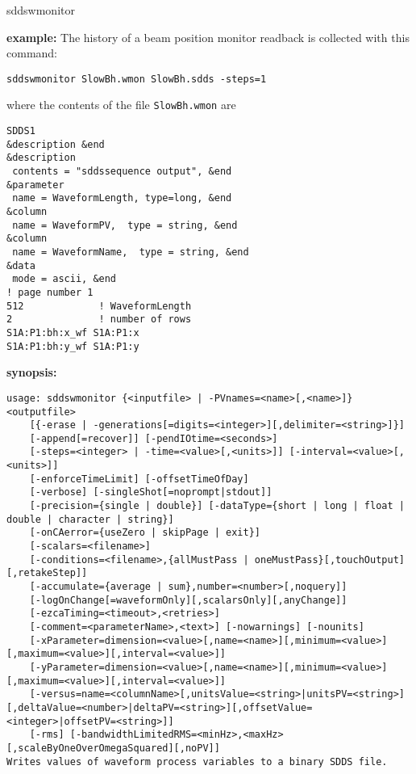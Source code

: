 \begin{sddsprog}{sddswmonitor}
\item {\bf example:} 
%
% 
%
The history of a beam position monitor readback is collected with this command:
\begin{verbatim}
sddswmonitor SlowBh.wmon SlowBh.sdds -steps=1
\end{verbatim}
where the contents of the file \verb+SlowBh.wmon+ are
\begin{verbatim}
SDDS1
&description &end
&description
 contents = "sddssequence output", &end
&parameter
 name = WaveformLength, type=long, &end
&column
 name = WaveformPV,  type = string, &end
&column
 name = WaveformName,  type = string, &end
&data
 mode = ascii, &end
! page number 1
512             ! WaveformLength
2               ! number of rows
S1A:P1:bh:x_wf S1A:P1:x
S1A:P1:bh:y_wf S1A:P1:y
\end{verbatim}
\item {\bf synopsis:} 
%
%
\begin{verbatim}
usage: sddswmonitor {<inputfile> | -PVnames=<name>[,<name>]} <outputfile>
    [{-erase | -generations[=digits=<integer>][,delimiter=<string>]}]
    [-append[=recover]] [-pendIOtime=<seconds>]
    [-steps=<integer> | -time=<value>[,<units>]] [-interval=<value>[,<units>]]
    [-enforceTimeLimit] [-offsetTimeOfDay]
    [-verbose] [-singleShot[=noprompt|stdout]]
    [-precision={single | double}] [-dataType={short | long | float | double | character | string}]
    [-onCAerror={useZero | skipPage | exit}]
    [-scalars=<filename>]
    [-conditions=<filename>,{allMustPass | oneMustPass}[,touchOutput][,retakeStep]]
    [-accumulate={average | sum},number=<number>[,noquery]]
    [-logOnChange[=waveformOnly][,scalarsOnly][,anyChange]]
    [-ezcaTiming=<timeout>,<retries>]
    [-comment=<parameterName>,<text>] [-nowarnings] [-nounits]
    [-xParameter=dimension=<value>[,name=<name>][,minimum=<value>][,maximum=<value>][,interval=<value>]]
    [-yParameter=dimension=<value>[,name=<name>][,minimum=<value>][,maximum=<value>][,interval=<value>]]
    [-versus=name=<columnName>[,unitsValue=<string>|unitsPV=<string>][,deltaValue=<number>|deltaPV=<string>][,offsetValue=<integer>|offsetPV=<string>]]
    [-rms] [-bandwidthLimitedRMS=<minHz>,<maxHz>[,scaleByOneOverOmegaSquared][,noPV]]
Writes values of waveform process variables to a binary SDDS file.
\end{verbatim}

\end{sddsprog}
